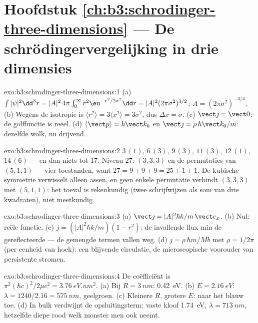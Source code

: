 \section*{Hoofdstuk \ref{ch:b3:schrodinger-three-dimensions} --- De schrödingervergelijking in drie dimensies}

\begin{solution}{exo:b3:schrodinger-three-dimensions:1}
(a) $\int|\psi|^2\dd^3r = |A|^2\,4\pi\int_0^\infty r^2\eu^{-r^2/2
\sigma^2}\dd r = |A|^2(2\pi\sigma^2)^{3/2}$: $A = (2\pi\sigma^2)^{
-3/4}$. (b) Wegens de isotropie is $\langle r^2\rangle = 3\langle x^2\rangle =
3\sigma^2$, dus $\Delta x = \sigma$. (c) $\vect\jmath = \vect 0$: de golffunctie is reëel. (d) $\langle\vect p\rangle = \hbar\vect k_0$ en $\vect\jmath = \rho\,\hbar\vect k_0/m$: dezelfde wolk,
nu drijvend.
\end{solution}

\begin{solution}{exo:b3:schrodinger-three-dimensions:2}
$3\,(1)$, $6\,(3)$, $9\,(3)$, $11\,(3)$, $12\,(1)$, $14\,(6)$ --- en dan
niets tot $17$. Niveau $27$: $(3,3,3)$ en de permutaties van $(5,1,1)$
--- vier toestanden, want $27 = 9+9+9 = 25+1+1$. De kubische symmetrie
verwisselt alleen assen, en geen enkele permutatie verbindt $(3,3,3)$ met
$(5,1,1)$: het toeval is rekenkundig (twee schrijfwijzen als som van drie
kwadraten), niet meetkundig.
\end{solution}

\begin{solution}{exo:b3:schrodinger-three-dimensions:3}
(a) $\vect\jmath = |A|^2\hbar k/m\,\vect e_x$. (b) Nul: reële functie.
(c) $j = (|A|^2\hbar k/m)(1 - r^2)$: de invallende flux min de
gereflecteerde --- de gemengde termen vallen weg. (d) $j = \rho\,\hbar
m/Mb$ met $\rho = 1/2\pi$ (per eenheid van hoek): een blijvende
circulatie, de microscopische voorouder van persistente stromen.
\end{solution}

\begin{solution}{exo:b3:schrodinger-three-dimensions:4}
De coëfficiënt is $\pi^2(\hbar c)^2/2\mu c^2 = \qty{3.76}{eV.nm^2}$.
(a) Bij $R = \qty{3}{nm}$: \qty{0.42}{eV}. (b) $E = \qty{2.16}{eV}$:
$\lambda = 1240/2.16 = \qty{575}{nm}$, geelgroen. (c) Kleinere $R$,
grotere $E$: naar het blauw toe. (d) In bulk verdwijnt de
opsluitingsterm: vaste kloof \qty{1.74}{eV}, $\lambda = \qty{713}{nm}$,
hetzelfde diepe rood welk monster men ook neemt.
\end{solution}

